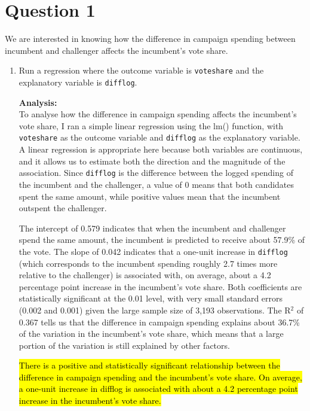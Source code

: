 \documentclass[12pt,letterpaper]{article}
\begin{document}
\section*{Question 1}
\vspace{.25cm}
\noindent We are interested in knowing how the difference in campaign spending between incumbent and challenger affects the incumbent's vote share. 
	\begin{enumerate}
		\item Run a regression where the outcome variable is \texttt{voteshare} and the explanatory variable is \texttt{difflog}.
		
		
		
		
		\textbf{Analysis:}\\
		To analyse how the difference in campaign spending affects the incumbent's vote share, I ran a simple linear regression using the lm() function, with \texttt{voteshare} as the outcome variable and \texttt{difflog} as the explanatory variable. A linear regression is appropriate here because both variables are continuous, and it allows us to estimate both the direction and the magnitude of the association. Since \texttt{difflog} is the difference between the logged spending of the incumbent and the challenger, a value of 0 means that both candidates spent the same amount, while positive values mean that the incumbent outspent the challenger.
		
		The intercept of 0.579 indicates that when the incumbent and challenger spend the same amount, the incumbent is predicted to receive about 57.9\% of the vote. The slope of 0.042 indicates that a one-unit increase in \texttt{difflog} (which corresponds to the incumbent spending roughly 2.7 times more relative to the challenger) is associated with, on average, about a 4.2 percentage point increase in the incumbent's vote share. Both coefficients are statistically significant at the 0.01 level, with very small standard errors (0.002 and 0.001) given the large sample size of 3,193 observations. The R$^2$ of 0.367 tells us that the difference in campaign spending explains about 36.7\% of the variation in the incumbent's vote share, which means that a large portion of the variation is still explained by other factors.
		
		\hl{There is a positive and statistically significant relationship between the difference in campaign spending and the incumbent's vote share. On average, a one-unit increase in difflog is associated with about a 4.2 percentage point increase in the incumbent's vote share.}
		

\end{enumerate}
\end{document}
